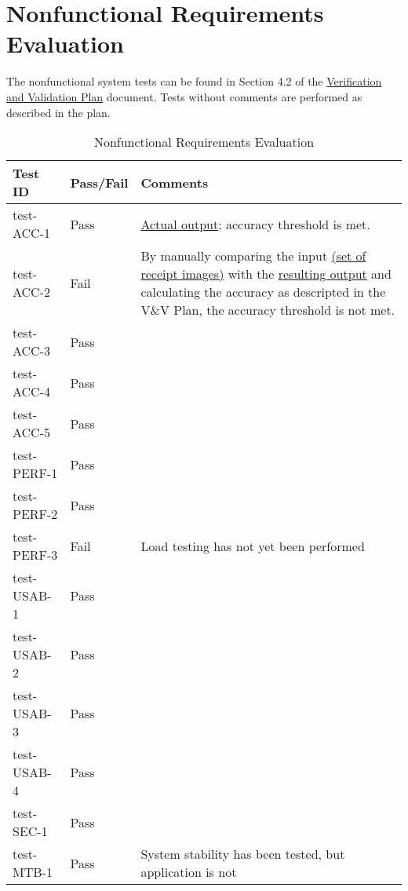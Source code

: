 \documentclass[12pt, titlepage]{article}
\begin{document}
\section{Nonfunctional Requirements Evaluation}

The nonfunctional system tests can be found in Section 4.2 of the
\href{https://github.com/PlutosCapstone/Plutos/blob/main/docs/VnVPlan/VnVPlan.pdf}{Verification
and Validation Plan} document. Tests without comments are performed as described
in the plan.


\begin{longtable}{>{\centering\arraybackslash}p{} >{\centering\arraybackslash}p{} >{\centering\arraybackslash}p{}}
  \caption{Nonfunctional Requirements Evaluation}\\
    \toprule
    \textbf{Test ID} & \textbf{Pass/Fail} & \textbf{Comments} \\
    \midrule
    test-ACC-1 & Pass &
    \href{https://github.com/PlutosCapstone/Plutos/tree/main/src/server/tests/imageProcessing/data/categorization/receipt_items_output.csv}{Actual
    output}; accuracy threshold is met. \\
    test-ACC-2 & Fail & By manually comparing the input
    \href{https://github.com/PlutosCapstone/Plutos/tree/main/src/server/tests/imageProcessing/data/parsing/input}{
    (set of receipt images)} with the
    \href{https://github.com/PlutosCapstone/Plutos/tree/main/src/server/tests/imageProcessing/data/parsing/input}{resulting
    output} and calculating the accuracy as descripted in the V\&V Plan, the
    accuracy threshold is not met. \\
    test-ACC-3 & Pass &  \\
    test-ACC-4 & Pass &  \\
    test-ACC-5 & Pass &  \\
    \midrule
    test-PERF-1 & Pass &  \\
    test-PERF-2 & Pass &  \\
    test-PERF-3 & Fail & Load testing has not yet been performed \\
    \midrule
    test-USAB-1 & Pass &  \\
    test-USAB-2 & Pass &  \\
    test-USAB-3 & Pass &  \\
    test-USAB-4 & Pass &  \\
    \midrule
    test-SEC-1 & Pass &  \\
    \midrule
    test-MTB-1 & Pass & System stability has been tested, but application is not

\end{longtable}
\end{document}
